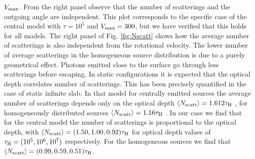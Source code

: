 $V_{\rm max}$.
From the right panel observe that the number of scatterings and the
outgoing angle are independent.
This plot corresponds to the specific case of the central model with
$\tau=10^5$ and $V_{\rm max}=300$\kms, but we have verified that this
holds for all models.
The right panel of Fig. \ref{fig:Nscatt} shows how the average
number of scatterings is also independent from the rotational
velocity.
The lower number of average scatterings in the homogeneous source
distribution is due to a purely geometrical effect.
Photons emitted close to the surface go through less scatterings
before escaping.
In static configurations it is expected that the optical depth correlates number of
scatterings.
This has been precisely quantified in the case of static infinite
slab.
In that model for centrally emitted sources the average number of
scatterings depends only on the optical depth $\langle N_{\rm
scatt}\rangle=1.612\tau_{\rm H}$ \citep{Adams72,Harrington73}, for
homogeneously distributed sources $\langle N_{\rm
scatt}\rangle=1.16\tau_{\rm H}$ \citep{Harrington73}.
In our case we find that for the central model the number of
scatterings is proportional to the optical depth, with $\langle N_{\rm
scatt}\rangle= (1.50, 1.00, 0.92)\tau_{\rm H}$ for optical depth
values of $\tau_{\rm H} = (10^{5}, 10^{6}, 10^{7})$ respectively.
For the homogeneous sources we find that $\langle N_{\rm
scatt}\rangle= (0.99, 0.59, 0.51)\tau_{\rm H}$.

